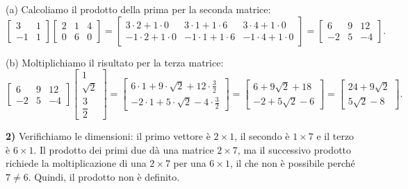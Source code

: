 \documentclass{article}
\theoremstyle{plain}
\theoremstyle{definition}
\theoremstyle{remark}
\begin{document}
(a) Calcoliamo il prodotto della prima per la seconda matrice:
\[
\begin{bmatrix}
3&1\\[4mm]
-1&1
\end{bmatrix}
\begin{bmatrix}
2&1&4\\[4mm]
0&6&0
\end{bmatrix}
=
\begin{bmatrix}
3\cdot2+1\cdot0 & 3\cdot1+1\cdot6 & 3\cdot4+1\cdot0 \\[4mm]
-1\cdot2+1\cdot0 & -1\cdot1+1\cdot6 & -1\cdot4+1\cdot0
\end{bmatrix}
=
\begin{bmatrix}
6 & 9 & 12 \\[4mm]
-2 & 5 & -4
\end{bmatrix}.
\]

(b) Moltiplichiamo il risultato per la terza matrice:
\[
\begin{bmatrix}
6 & 9 & 12 \\
-2 & 5 & -4
\end{bmatrix}
\begin{bmatrix}
1\\[2mm]
\sqrt{2}\\[2mm]
\dfrac{3}{2}
\end{bmatrix}
=
\begin{bmatrix}
6\cdot1+9\cdot\sqrt{2}+12\cdot\frac{3}{2} \\[4mm]
-2\cdot1+5\cdot\sqrt{2}-4\cdot\frac{3}{2}
\end{bmatrix}
=
\begin{bmatrix}
6+9\sqrt{2}+18 \\[4mm]
-2+5\sqrt{2}-6
\end{bmatrix}
=
\begin{bmatrix}
24+9\sqrt{2} \\[4mm]
5\sqrt{2}-8
\end{bmatrix}.
\]

\medskip
\textbf{2)} 
Verifichiamo le dimensioni: il primo vettore è $2\times1$, il secondo è $1\times7$ e il terzo è $6\times1$. Il prodotto dei primi due dà una matrice $2\times7$, ma il successivo prodotto richiede la moltiplicazione di una $2\times7$ per una $6\times1$, il che non è possibile perché $7\neq6$. Quindi, il prodotto non è definito.
\end{document}
